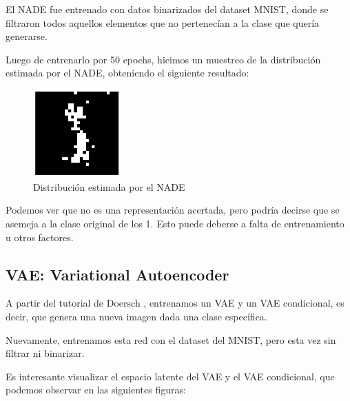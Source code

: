 \documentclass[11pt]{article}
\begin{document}
El NADE fue entrenado con datos binarizados del dataset MNIST, donde se filtraron todos aquellos elementos que no pertenecían a la clase que quería generarse.

Luego de entrenarlo por 50 epochs, hicimos un muestreo de la distribución estimada por el NADE, obteniendo el siguiente resultado:

\begin{figure}[h]
    \centering
    \includegraphics[width=0.3\textwidth]{NADE/nade_generation.png}
    \caption{Distribución estimada por el NADE}
    \label{fig:nade_gen}
\end{figure}

Podemos ver que no es una representación acertada, pero podría decirse que se asemeja a la clase original de los 1. Esto puede deberse a falta de entrenamiento u otros factores.
\newpage
\subsection{VAE: Variational Autoencoder}

A partir del tutorial de Doersch \cite{vae}, entrenamos un VAE y un VAE condicional, es decir, que genera una nueva imagen dada una clase específica.

Nuevamente, entrenamos esta red con el dataset del MNIST, pero esta vez sin filtrar ni binarizar.

Es interesante visualizar el espacio latente del VAE y el VAE condicional, que podemos observar en las siguientes figuras:
\end{document}
